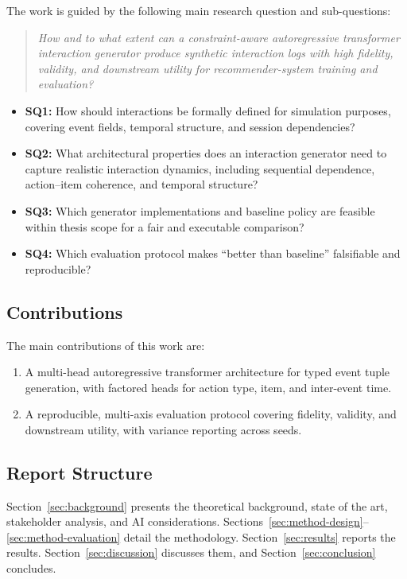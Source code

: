 \documentclass[sigconf,nonacm]{acmart}
\begin{document}
The work is guided by the following main research question and sub-questions:
\begin{quote}
\textit{How and to what extent can a constraint-aware autoregressive
transformer interaction generator produce synthetic interaction logs with
high fidelity, validity, and downstream utility for recommender-system
training and evaluation?}
\end{quote}

\begin{itemize}[leftmargin=*]
  \item \textbf{SQ1:} How should interactions be formally defined for
    simulation purposes, covering event fields, temporal structure, and
    session dependencies?
  \item \textbf{SQ2:} What architectural properties does an interaction
    generator need to capture realistic interaction dynamics, including
    sequential dependence, action--item coherence, and temporal structure?
  \item \textbf{SQ3:} Which generator implementations and baseline policy
    are feasible within thesis scope for a fair and executable comparison?
  \item \textbf{SQ4:} Which evaluation protocol makes ``better than
    baseline'' falsifiable and reproducible?
\end{itemize}

\subsection{Contributions}
The main contributions of this work are:
\begin{enumerate}[leftmargin=*]
  \item A multi-head autoregressive transformer architecture for typed event
    tuple generation, with factored heads for action type, item, and
    inter-event time.
  \item A reproducible, multi-axis evaluation protocol covering fidelity,
    validity, and downstream utility, with variance reporting across seeds.
\end{enumerate}

\subsection{Report Structure}
Section~\ref{sec:background} presents the theoretical background, state of
the art, stakeholder analysis, and AI considerations.
Sections~\ref{sec:method-design}--\ref{sec:method-evaluation} detail the
methodology. Section~\ref{sec:results} reports the results.
Section~\ref{sec:discussion} discusses them, and
Section~\ref{sec:conclusion} concludes.
\end{document}
